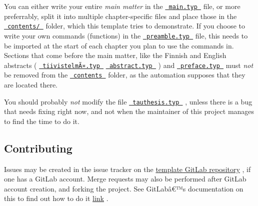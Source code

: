 You can either write your entire \emph{main matter} in the
\href{https://github.com/typst/packages/raw/main/packages/preview/scholarly-tauthesis/0.9.0/template/main.typ}{\texttt{\ main.typ\ }}
file, or more preferrably, split it into multiple chapter-specific files
and place those in the
\href{https://github.com/typst/packages/raw/main/packages/preview/scholarly-tauthesis/0.9.0/template/content}{\texttt{\ contents/\ }}
folder, which this template tries to demonstrate. If you choose to write
your own commands (functions) in the
\href{https://github.com/typst/packages/raw/main/packages/preview/scholarly-tauthesis/0.9.0/template/preamble.typ}{\texttt{\ preamble.typ\ }}
file, this needs to be imported at the start of each chapter you plan to
use the commands in. Sections that come before the main matter, like the
Finnish and English abstracts (
\href{https://github.com/typst/packages/raw/main/packages/preview/scholarly-tauthesis/0.9.0/template/content/tiivistelm\%C3\%A4.typ}{\texttt{\ tiivistelmÃ¤.typ\ }}
\textbar{}
\href{https://github.com/typst/packages/raw/main/packages/preview/scholarly-tauthesis/0.9.0/template/content/abstract.typ}{\texttt{\ abstract.typ\ }}
) and
\href{https://github.com/typst/packages/raw/main/packages/preview/scholarly-tauthesis/0.9.0/template/content/preface.typ}{\texttt{\ preface.typ\ }}
must \emph{not} be removed from the
\href{https://github.com/typst/packages/raw/main/packages/preview/scholarly-tauthesis/0.9.0/template/content}{\texttt{\ contents\ }}
folder, as the automation supposes that they are located there.

You should probably \emph{not} modify the file
\href{https://github.com/typst/packages/raw/main/packages/preview/scholarly-tauthesis/0.9.0/tauthesis.typ}{\texttt{\ tauthesis.typ\ }}
, unless there is a bug that needs fixing right now, and not when the
maintainer of this project manages to find the time to do it.

\subsection{Contributing}\label{contributing}

Issues may be created in the issue tracker on the
\href{https://gitlab.com/tuni-official/thesis-templates/tau-typst-thesis-template}{template
GitLab repository} , if one has a GitLab account. Merge requests may
also be performed after GitLab account creation, and forking the
project. See GitLabâ€™s documentation on this to find out how to do it
\href{https://docs.gitlab.com/ee/user/project/repository/forking_workflow.html}{link}
.

